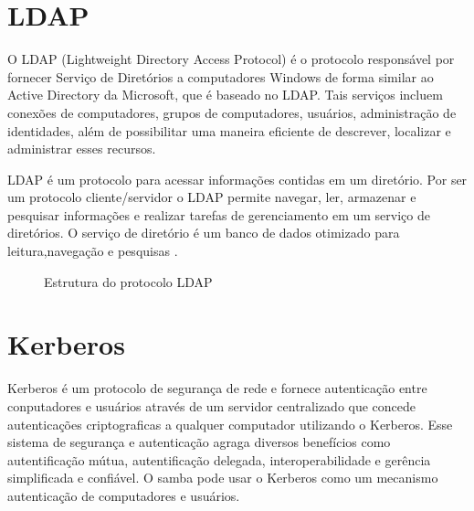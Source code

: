 \section{LDAP}

O LDAP (Lightweight Directory Access Protocol) é o protocolo responsável por fornecer Serviço de Diretórios a computadores Windows de forma similar ao Active Directory da Microsoft, que é baseado no LDAP. Tais serviços incluem conexões de computadores, grupos de computadores, usuários, administração de identidades, além de possibilitar uma maneira eficiente de descrever, localizar e administrar esses recursos.

LDAP é um protocolo para acessar informações contidas em um diretório. Por ser um protocolo cliente/servidor o LDAP permite navegar, ler, armazenar e pesquisar informações e realizar tarefas de gerenciamento em um serviço de diretórios. O serviço de diretório é um banco de dados otimizado para leitura,navegação e pesquisas \cite{TRIGO}.

\begin{figure}[ht]
   	\centering
   	\caption{Estrutura do protocolo LDAP \cite{LDAP}}
    \label{ldap}
\end{figure}

\section{Kerberos}

Kerberos é um protocolo de segurança de rede e fornece autenticação entre conputadores e usuários através de um servidor centralizado que concede autenticações criptograficas a qualquer computador utilizando o Kerberos. Esse sistema de segurança e autenticação agraga diversos benefícios como autentificação mútua, autentificação delegada, interoperabilidade e gerência simplificada e confiável. O samba pode usar o Kerberos como um mecanismo autenticação de computadores e usuários.

